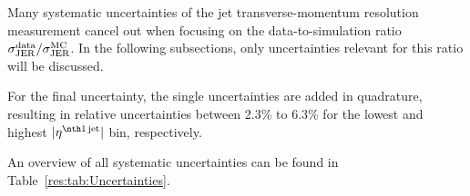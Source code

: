 Many systematic uncertainties of the jet transverse-momentum resolution measurement cancel out when focusing on the data-to-simulation ratio $\jer^{\text{data}}/\jer^{\text{MC}}$.
In the following subsections, only uncertainties relevant for this ratio will be discussed.

For the final uncertainty, the single uncertainties are added in quadrature, resulting in relative uncertainties between 2.3\% to 6.3\% for the lowest and highest $|\etafirstjet|$ bin, respectively. 

An overview of all systematic uncertainties can be found in Table~\ref{res:tab:Uncertainties}.

\renewcommand{\arraystretch}{1.1}
\begin{table}[h]
\centering
\caption{All relative systematic uncertainties on the data-to-simulation ratio $\jer^{\text{data}}/\jer^{\text{MC}}$ listed by sources for the different $|\eta^{\text{jet}}|$ bins.}
\label{res:tab:Uncertainties}
\end{table} 


